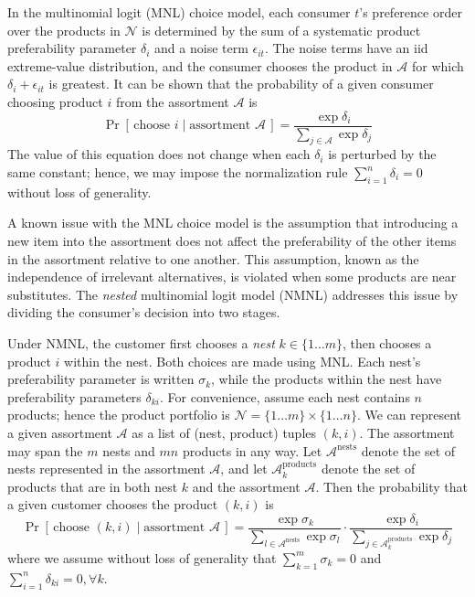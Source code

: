 \documentclass[preprint,12pt,authoryear]{elsarticle}
\begin{document}
In the multinomial logit (MNL) choice model, each consumer $t$'s preference order over the products in $\mathcal{N}$ is determined by the sum of a systematic product preferability parameter $\delta_i$ and a noise term $\epsilon_{it}$. The noise terms have an iid extreme-value distribution, and the consumer chooses the product in $\mathcal{A}$ for which $\delta_i + \epsilon_{it}$ is greatest. It can be shown that the probability of a given consumer choosing product $i$ from the assortment $\mathcal{A}$ is
\begin{equation}\label{mnlchoiceprobability}
\operatorname{Pr}\left[\,\text{choose } i \;|\;\text{assortment }\mathcal{A}\,\right] =\frac{\exp \delta_i}{\sum_{j\in \mathcal{A}} \exp \delta_j}
\end{equation}
The value of this equation does not change when each $\delta_i$ is perturbed by the same constant; hence, we may impose the normalization rule $\sum_{i=1}^n \delta_i = 0$ without loss of generality. 

A known issue with the MNL choice model is the assumption that introducing a new item into the assortment does not affect the preferability of the other items in the assortment relative to one another. This assumption, known as the independence of irrelevant alternatives, is violated when some products are near substitutes. The \emph{nested} multinomial logit model (NMNL) addresses this issue by dividing the consumer’s decision into two stages. 

Under NMNL, the customer first chooses a \emph{nest} $k \in \{ 1 \dots m\}$, then chooses a product $i$ within the nest. Both choices are made using MNL. Each nest's preferability parameter is written $\sigma_k$, while the products within the nest have preferability parameters $\delta_{ki}$. For convenience, assume each nest contains $n$ products; hence the product portfolio is $\mathcal{N} = \{1\dots m\} \times \{1\dots n\}$. We can represent a given assortment $\mathcal{A}$ as a list of (nest, product) tuples $(k, i)$. The assortment may span the $m$ nests and $mn$ products in any way. Let $\mathcal{A}^{\text{nests}}$ denote the set of nests represented in the assortment $\mathcal{A}$, and let $\mathcal{A}_k^{\text{products}}$ denote the set of products that are in both nest $k$ and the assortment $\mathcal{A}$. Then the probability that a given customer chooses the product $(k, i)$ is
\begin{equation}\label{nmnlchoiceprobability}
\operatorname{Pr}\left[\,\text{choose } (k, i) \;|\;\text{assortment }\mathcal{A}\,\right] =\frac{\exp \sigma_k}{\sum_{l\in \mathcal{A}^{\text{nests}}} \exp \sigma_l} \cdot \frac{\exp \delta_i}{\sum_{j\in\mathcal{A}_{k}^{\text{products}}} \exp \delta_j}\end{equation}
where we assume without loss of generality that $\sum_{k=1}^m \sigma_k = 0$ and $\sum_{i=1}^n \delta_{ki} = 0, \forall k$. 
\end{document}
